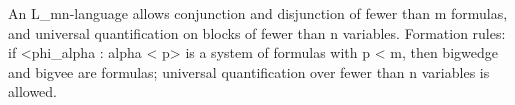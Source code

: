 An L_{mn}-language allows conjunction and disjunction of fewer than m formulas, and universal quantification on blocks of fewer than n variables. Formation rules: if <phi_alpha : alpha < p> is a system of formulas with p < m, then bigwedge and bigvee are formulas; universal quantification over fewer than n variables is allowed.
